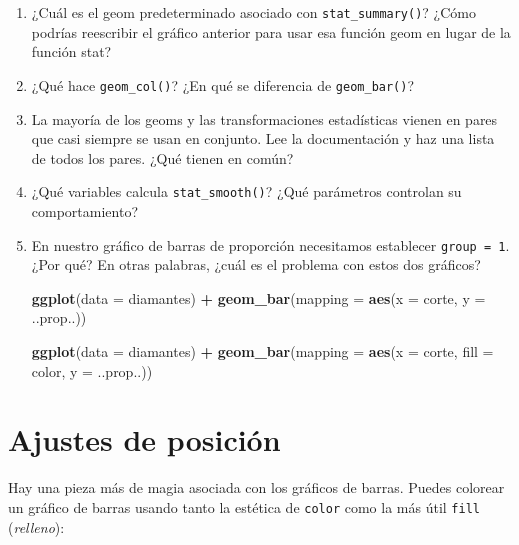 \documentclass[11pt,oneside]{report}
\newenvironment{Shaded}{\begin{snugshade}}{\end{snugshade}}
\newcommand{\DataTypeTok}[1]{\textcolor[rgb]{0.13,0.29,0.53}{#1}}
\newcommand{\KeywordTok}[1]{\textcolor[rgb]{0.13,0.29,0.53}{\textbf{#1}}}
\newcommand{\NormalTok}[1]{#1}
\newcommand{\OperatorTok}[1]{\textcolor[rgb]{0.81,0.36,0.00}{\textbf{#1}}}
\newcommand{\StringTok}[1]{\textcolor[rgb]{0.31,0.60,0.02}{#1}}
\begin{document}
\begin{enumerate}
\def\labelenumi{\arabic{enumi}.}
\item
  ¿Cuál es el geom predeterminado asociado con \texttt{stat\_summary()}?
  ¿Cómo podrías reescribir el gráfico anterior para usar esa función
  geom en lugar de la función stat?
\item
  ¿Qué hace \texttt{geom\_col()}? ¿En qué se diferencia de
  \texttt{geom\_bar()}?
\item
  La mayoría de los geoms y las transformaciones estadísticas vienen en
  pares que casi siempre se usan en conjunto. Lee la documentación y haz
  una lista de todos los pares. ¿Qué tienen en común?
\item
  ¿Qué variables calcula \texttt{stat\_smooth()}? ¿Qué parámetros
  controlan su comportamiento?
\item
  En nuestro gráfico de barras de proporción necesitamos establecer
  \texttt{group\ =\ 1}. ¿Por qué? En otras palabras, ¿cuál es el
  problema con estos dos gráficos?

\begin{Shaded}
\begin{Highlighting}[]
\KeywordTok{ggplot}\NormalTok{(}\DataTypeTok{data =}\NormalTok{ diamantes) }\OperatorTok{+}
\StringTok{  }\KeywordTok{geom_bar}\NormalTok{(}\DataTypeTok{mapping =} \KeywordTok{aes}\NormalTok{(}\DataTypeTok{x =}\NormalTok{ corte, }\DataTypeTok{y =}\NormalTok{ ..prop..))}

\KeywordTok{ggplot}\NormalTok{(}\DataTypeTok{data =}\NormalTok{ diamantes) }\OperatorTok{+}
\StringTok{  }\KeywordTok{geom_bar}\NormalTok{(}\DataTypeTok{mapping =} \KeywordTok{aes}\NormalTok{(}\DataTypeTok{x =}\NormalTok{ corte, }\DataTypeTok{fill =}\NormalTok{ color, }\DataTypeTok{y =}\NormalTok{ ..prop..))}
\end{Highlighting}
\end{Shaded}
\end{enumerate}

\hypertarget{ajustes-de-posiciuxf3n}{%
\section{Ajustes de posición}\label{ajustes-de-posiciuxf3n}}

Hay una pieza más de magia asociada con los gráficos de barras. Puedes
colorear un gráfico de barras usando tanto la estética de \texttt{color}
como la más útil \texttt{fill} (\emph{relleno}):
\end{document}
